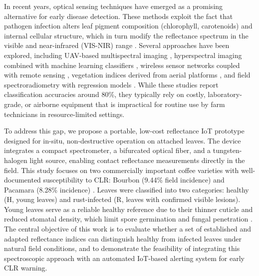 \documentclass[conference]{IEEEtran}
\begin{document}
In recent years, optical sensing techniques have emerged as a promising alternative for early disease detection. These methods exploit the fact that pathogen infection alters leaf pigment composition (chlorophyll, carotenoids) and internal cellular structure, which in turn modify the reflectance spectrum in the visible and near-infrared (VIS-NIR) range \cite{oliveira2022,gitelson2002}. Several approaches have been explored, including UAV-based multispectral imaging \cite{oliveira2022}, hyperspectral imaging combined with machine learning classifiers \cite{castro2018}, wireless sensor networks coupled with remote sensing \cite{velasquez2020}, vegetation indices derived from aerial platforms \cite{marin2021}, and field spectroradiometry with regression models \cite{chemuramutanga2018}. While these studies report classification accuracies around 80\%, they typically rely on costly, laboratory-grade, or airborne equipment that is impractical for routine use by farm technicians in resource-limited settings.

To address this gap, we propose a portable, low-cost reflectance IoT prototype designed for in-situ, non-destructive operation on attached leaves. The device integrates a compact spectrometer, a bifurcated optical fiber, and a tungsten-halogen light source, enabling contact reflectance measurements directly in the field. This study focuses on two commercially important coffee varieties with well-documented susceptibility to CLR: Bourbon (9.44\% field incidence) and Pacamara (8.28\% incidence) \cite{catie2018,oliveiradesouza2022}. Leaves were classified into two categories: healthy (H, young leaves) and rust-infected (R, leaves with confirmed visible lesions). Young leaves serve as a reliable healthy reference due to their thinner cuticle and reduced stomatal density, which limit spore germination and fungal penetration \cite{kushalappa1983}. The central objective of this work is to evaluate whether a set of established and adapted reflectance indices can distinguish healthy from infected leaves under natural field conditions, and to demonstrate the feasibility of integrating this spectroscopic approach with an automated IoT-based alerting system for early CLR warning.
\end{document}
